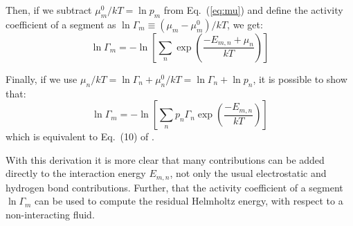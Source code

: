 \documentclass[3p]{elsarticle}
\begin{document}
Then, if we subtract $\mu_m^0/kT = \ln{p_m}$ from Eq.~(\ref{eq:mu})
and define the activity coefficient of a segment as
$\ln\Gamma_m \equiv (\mu_m - \mu_m^0)/kT$, we get:
\begin{equation}\label{eq:lnGAMMA}
	\ln\Gamma_m =-\ln\left[\sum_n
	\exp\left(\frac{-E_{m,n} + \mu_n}{kT}\right)\right]
\end{equation}

Finally, if we use $\mu_n/kT = \ln\Gamma_n + \mu_n^0/kT =
\ln\Gamma_n + \ln p_n$, it is possible to show that:
\begin{equation}\label{eq:lnGAMMA}
	\ln\Gamma_m =-\ln\left[\sum_n p_n \Gamma_n
	\exp\left(\frac{-E_{m,n}}{kT}\right)\right]
\end{equation}
which is equivalent to Eq.~(10) of \cite{Lin:2002}.

With this derivation it is more clear that many contributions can be added directly
to the interaction energy $E_{m,n}$, not only the usual electrostatic and
hydrogen bond contributions.
Further, that the activity coefficient of a segment $\ln\Gamma_m$ can be used
to compute the residual Helmholtz energy, with respect to a non-interacting
fluid.


\end{document}
